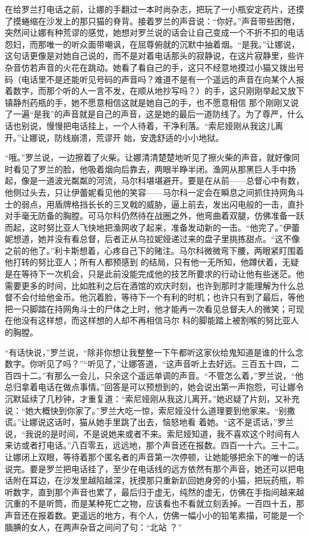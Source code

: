 \documentclass{article}
\begin{document}
在给罗兰打电话之前，让娜的手翻过一本时尚杂志，把玩了一小瓶安定药片，还摸了摸蜷缩在沙发上的那只猫的脊背。接着罗兰的声音说：“你好。”声音带些困倦，突然间让娜有种荒谬的感觉，她想对罗兰说的话会让自己变成一个不折不扣的电话怨妇，而那唯一的听众面带嘲讽，在屈尊俯就的沉默中抽着烟。“是我。”让娜说，这句话更像是对她自己说的，而不是对着电话那头的寂静说，在这片寂静里，些许杂音仿若声音的火花在跳动。她看了看自己的手，这只不经意地摸过小猫又拨出号码（电话里不是还能听见号码的声音吗？难道不是有一个遥远的声音在向某个人报着数字，而那个听的人一言不发，在顺从地抄写吗？）的手，这只刚刚举起又放下镇静剂药瓶的手，她不愿意相信这就是她自己的手，也不愿意相信
\newpage
那个刚刚又说了一遍“是我”的声音就是自己的声音，这是她的最后一道防线了。为了尊严，什么话也别说，慢慢把电话挂上，一个人待着，干净利落。“索尼娅刚从我这儿离开。”让娜说，防线崩溃，荒谬开
始，安逸舒适的小小地狱。 

“哦。”罗兰说，一边擦着了火柴。让娜清清楚楚地听见了擦火柴的声音，就好像同时看见了罗兰的脸，他吸着烟向后靠去，两眼半睁半闭。渔网从那黑巨人手中扬起，像是一道波光粼粼的河流，马尔科堪堪避开。要是在从前——总督心中有数，他侧过头去，只让伊蕾妮看见他的笑容——马尔科一定会在瞬息之间抓住持网角斗士的弱点，用盾牌格挡长长的三叉戟的威胁，逼上前去，发出闪电般的一击，直扑对手毫无防备的胸膛。可马尔科仍然待在战圈之外，他弯曲着双腿，仿佛准备一跃而起，这时努比亚人飞快地把渔网收了起来，准备发动新的一击。“他完了。”伊蕾妮想道，她并没有看总督，后者正从乌拉妮娅递过来的盘子里挑拣甜点。“这不像之前的他了。”利卡斯想着，心疼自己下的赌注。马尔科微微弯下腰，两眼紧盯围着他打转的努比亚人；所有人都预感到
\newpage
的结局，只有他一无所知，他蹲伏着，无疑是在等待下一次机会，只是此前没能完成他的技艺所要求的行动让他有些迷茫。他需要更多的时间，比如胜利之后在酒馆的欢庆时刻，也许到那时才能理解为什么总督不会付给他金币。他沉着脸，等待下一个有利的时机；也许只有到了最后，等他把一只脚踏在持网角斗士的尸体之上时，他才能再一次看见总督夫人的微笑；可现在他没有这样想，而这样想的人却不再相信马尔
科的脚能踏上被割喉的努比亚人的胸膛。 

“有话快说，”罗兰说，“除非你想让我整整一下午都听这家伙给鬼知道是谁的什么念数字。你听见了吗？”“听见了，”让娜答道，“这声音听上去好远。三百五十四，二百四十二。”有那么一会儿，只余这个遥远单调的声音。“不管怎么着，”罗兰说，“他总归拿着电话在做点事情。”回答是可以预想到的，她会说出第一声抱怨，可让娜令沉默延续了几秒钟，才重复道：“索尼娅刚从我这儿离开。”她迟疑了片刻，又补充说：“她大概快到你家了。”罗兰大吃一惊，索尼娅没什么道理要到他家来。“别撒谎。”让娜说这话时，猫从她手里跳了出去，恼怒地看
\newpage
着她。“这不是谎话，”罗兰说，“我说的是时间，不是说她来或者不来。索尼娅知道，我不喜欢这个时间有人来访或者打电话。”八百零五，远远地，那个声音还在报数。四百一十六。三十二。让娜闭上双眼，等待着那个匿名者的声音第一次停顿，让她能够把余下的唯一的话说完。要是罗兰把电话挂了，至少在电话线的远方依然有那个声音，她还可以把电话附在耳边，在沙发里越陷越深，抚摸那只重新趴回她身旁的小猫，把玩药瓶，聆听数字，直到那个声音也累了，最后归于虚无，纯然的虚无，仿佛在手指间越来越沉重的不是听筒，而是某种死亡之物，应该看也不看就立刻丢掉。一百四十五，那声音还在报着数。更遥远的地方，有个人，仿佛一幅小小的铅笔素描，可能是一个腼腆的女人，在两声杂音之间问了句：“北站
？” 
\end{document}
